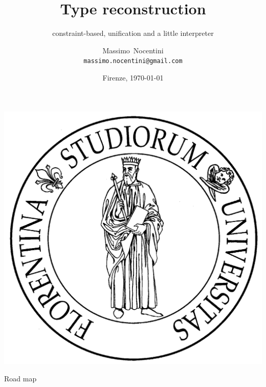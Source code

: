 \documentclass[8pt]{beamer}
\title[Type reconstruction] {Type reconstruction}
\subtitle{constraint-based, unification and a little interpreter}
\author[Massimo Nocentini] %
{Massimo~Nocentini\\\texttt{massimo.nocentini@gmail.com}}
\institute[UniversitaStudiFirenze] %
 { Universit\`a degli Studi di Firenze }
\date[CoursePresentation] %
{Firenze, \today}
\begin{document}
\begin{frame}[plain]
  \titlepage
   \begin{center}
     \includegraphics[scale=.065]{logo/unifi}
   \end{center}
\end{frame}

\begin{frame}{Road map}
  \tableofcontents[pausesections]
\end{frame}




\end{document}
